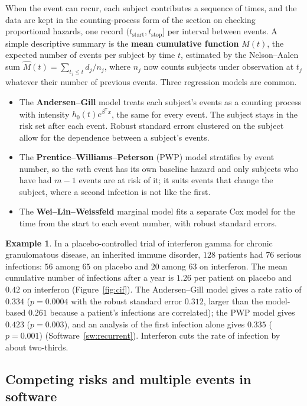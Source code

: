 \documentclass[11pt,a4paper]{article}
\numberwithin{equation}{section}
\theoremstyle{definition}
\newtheorem{exa}[thm]{Example}
\begin{document}
When the event can recur, each subject contributes a sequence of times, and the data are kept in the counting-process form of the section on checking proportional hazards, one record $(t_{\text{start}}, t_{\text{stop}}]$ per interval between events. A simple descriptive summary is the \textbf{mean cumulative function} $M(t)$, the expected number of events per subject by time $t$, estimated by the
Nelson--Aalen sum $\hat M(t) = \sum_{t_j \le t}d_j/n_j$, where $n_j$ now counts subjects under observation at $t_j$ whatever their number of previous events. Three regression models are common.
\begin{itemize}
\item The \textbf{Andersen--Gill} model treats each subject's events as a counting process with intensity $h_0(t)e^{\beta^{\mathsf T}x}$, the same for every event. The subject stays in the risk set after each event. Robust standard errors clustered on the subject allow for the dependence between a subject's events.
\item The \textbf{Prentice--Williams--Peterson} (PWP) model stratifies by event number, so the $m$th event has its own baseline hazard and only subjects who have had $m - 1$ events are at risk of it; it suits events that change the subject, where a second infection is not like the first.
\item The \textbf{Wei--Lin--Weissfeld} marginal model fits a separate Cox model for the time from the start to each event number, with robust standard errors.
\end{itemize}

\begin{exa}
\label{ex:cgd}
In a placebo-controlled trial of interferon gamma for chronic granulomatous disease, an inherited immune disorder, $128$ patients had $76$ serious infections: $56$ among $65$ on placebo and $20$ among $63$ on interferon. The mean cumulative number of infections after a year is $1.26$ per patient on placebo and $0.42$ on interferon (Figure~\ref{fig:cif}). The Andersen--Gill model gives a rate ratio of $0.334$ ($p = 0.0004$ with the robust
standard error $0.312$, larger than the model-based $0.261$ because a patient's infections are correlated); the PWP model gives $0.423$ ($p = 0.003$), and an analysis of the first infection alone gives $0.335$ ($p = 0.001$) (Software~\ref{sw:recurrent}). Interferon cuts the rate of infection by about two-thirds.
\end{exa}

\subsection{Competing risks and multiple events in software}
\label{ssec:software11}
\end{document}
